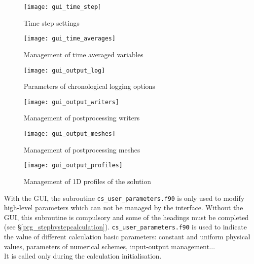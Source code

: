 {{\begin{figure}[!ht]
\begin{center}
\texttt{[image: gui\_time\_step]}
\caption{Time step settings}
\label{gui_time_step}
\end{center}
\end{figure}

\begin{figure}[!ht]
\begin{center}
\texttt{[image: gui\_time\_averages]}
\caption{Management of time averaged variables}
\label{gui_time_averages}
\end{center}
\end{figure}

\begin{figure}[!ht]
\begin{center}
\texttt{[image: gui\_output\_log]}
\caption{Parameters of chronological logging options}
\label{gui_output_log}
\end{center}
\end{figure}

\begin{figure}[!ht]
\begin{center}
\texttt{[image: gui\_output\_writers]}
\caption{Management of postprocessing writers}
\label{gui_output_writers}
\end{center}
\end{figure}

\begin{figure}[!ht]
\begin{center}
\texttt{[image: gui\_output\_meshes]}
\caption{Management of postprocessing meshes}
\label{gui_output_meshes}
\end{center}
\end{figure}

\begin{figure}[!ht]
\begin{center}
\texttt{[image: gui\_output\_profiles]}
\caption{Management of 1D profiles of the solution}
\label{gui_output_profiles}
\end{center}
\end{figure}

With the GUI, the subroutine \texttt{cs\_user\_parameters.f90} is only
used to modify high-level parameters which can not be managed by the
interface. Without the GUI, this
subroutine is compulsory and some of the headings must be completed (see \S\ref{prg_stepbystepcalculation}). 
\texttt{cs\_user\_parameters.f90} 
is used to indicate the value of different calculation
basic parameters: constant and uniform physical values, parameters of
numerical schemes, input-output management...\\
It is called only during the calculation initialisation.

}}
